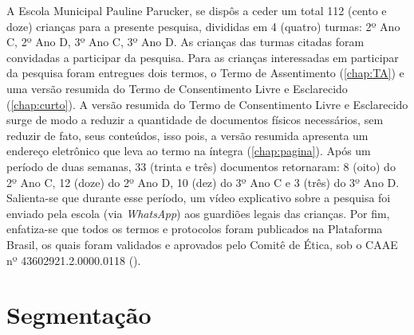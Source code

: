 A Escola Municipal Pauline Parucker, se dispôs a ceder um total 112 (cento e doze) crianças para a presente pesquisa, divididas em 4 (quatro) turmas: 2º Ano C, 2º Ano D, 3º Ano C, 3º Ano D. As crianças das turmas citadas foram convidadas a participar da pesquisa. Para as crianças interessadas em participar da pesquisa foram entregues dois termos, o Termo de Assentimento (\autoref{chap:TA}) e uma versão resumida do Termo de Consentimento Livre e Esclarecido (\autoref{chap:curto}). A versão resumida do Termo de Consentimento Livre e Esclarecido surge de modo a reduzir a quantidade de documentos físicos necessários, sem reduzir de fato, seus conteúdos, isso pois, a versão resumida apresenta um endereço eletrônico que leva ao termo na íntegra (\autoref{chap:pagina}). Após um período de duas semanas, 33 (trinta e três) documentos retornaram: 8 (oito) do 2º Ano C, 12 (doze) do 2º Ano D, 10 (dez) do 3º Ano C e 3 (três) do 3º Ano D. Salienta-se que durante esse período, um vídeo explicativo sobre a pesquisa foi enviado pela escola (via \textit{WhatsApp}) aos guardiões legais das crianças. Por fim, enfatiza-se que todos os termos e protocolos foram publicados na Plataforma Brasil, os quais foram validados e aprovados pelo Comitê de Ética, sob o \ac{CAAE} nº 43602921.2.0000.0118 ().



\section{Segmentação}\label{sec:seg}

